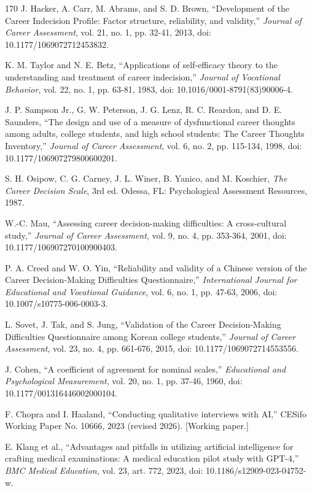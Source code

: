 \begin{thebibliography}{170}
 J. Hacker, A. Carr, M. Abrams, and S. D. Brown, ``Development of the Career Indecision Profile: Factor structure, reliability, and validity,'' \textit{Journal of Career Assessment}, vol. 21, no. 1, pp. 32-41, 2013, doi: 10.1177/1069072712453832.

 K. M. Taylor and N. E. Betz, ``Applications of self-efficacy theory to the understanding and treatment of career indecision,'' \textit{Journal of Vocational Behavior}, vol. 22, no. 1, pp. 63-81, 1983, doi: 10.1016/0001-8791(83)90006-4.

 J. P. Sampson Jr., G. W. Peterson, J. G. Lenz, R. C. Reardon, and D. E. Saunders, ``The design and use of a measure of dysfunctional career thoughts among adults, college students, and high school students: The Career Thoughts Inventory,'' \textit{Journal of Career Assessment}, vol. 6, no. 2, pp. 115-134, 1998, doi: 10.1177/106907279800600201.

 S. H. Osipow, C. G. Carney, J. L. Winer, B. Yanico, and M. Koschier, \textit{The Career Decision Scale}, 3rd ed. Odessa, FL: Psychological Assessment Resources, 1987.

 W.-C. Mau, ``Assessing career decision-making difficulties: A cross-cultural study,'' \textit{Journal of Career Assessment}, vol. 9, no. 4, pp. 353-364, 2001, doi: 10.1177/106907270100900403.

 P. A. Creed and W. O. Yin, ``Reliability and validity of a Chinese version of the Career Decision-Making Difficulties Questionnaire,'' \textit{International Journal for Educational and Vocational Guidance}, vol. 6, no. 1, pp. 47-63, 2006, doi: 10.1007/s10775-006-0003-3.

 L. Sovet, J. Tak, and S. Jung, ``Validation of the Career Decision-Making Difficulties Questionnaire among Korean college students,'' \textit{Journal of Career Assessment}, vol. 23, no. 4, pp. 661-676, 2015, doi: 10.1177/1069072714553556.

 J. Cohen, ``A coefficient of agreement for nominal scales,'' \textit{Educational and Psychological Measurement}, vol. 20, no. 1, pp. 37-46, 1960, doi: 10.1177/001316446002000104.

 F. Chopra and I. Haaland, ``Conducting qualitative interviews with AI,'' CESifo Working Paper No. 10666, 2023 (revised 2026). [Working paper.]

 E. Klang et al., ``Advantages and pitfalls in utilizing artificial intelligence for crafting medical examinations: A medical education pilot study with GPT-4,'' \textit{BMC Medical Education}, vol. 23, art. 772, 2023, doi: 10.1186/s12909-023-04752-w.


\end{thebibliography}

